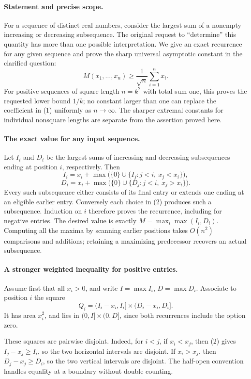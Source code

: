\paragraph{Statement and precise scope.}
For a sequence of distinct real numbers, consider the largest sum of a nonempty increasing or decreasing subsequence. The original request to ``determine'' this quantity has more than one possible interpretation. We give an exact recurrence for any given sequence and prove the sharp universal asymptotic constant in the clarified question:
\[
 M(x_1,\ldots,x_n)\geq\frac1{\sqrt n}\sum_{i=1}^n x_i.
 \tag{1}
\]
For positive sequences of square length \(n=k^2\) with total sum one, this proves the requested lower bound \(1/k\); no constant larger than one can replace the coefficient in (1) uniformly as \(n\to\infty\). The sharper extremal constants for individual nonsquare lengths are separate from the assertion proved here.

\paragraph{The exact value for any input sequence.}
Let \(I_i\) and \(D_i\) be the largest sums of increasing and decreasing subsequences ending at position \(i\), respectively. Then
\[
 I_i=x_i+\max\bigl(\{0\}\cup\{I_j:j<i,\ x_j<x_i\}\bigr),
\]
\[
 D_i=x_i+\max\bigl(\{0\}\cup\{D_j:j<i,\ x_j>x_i\}\bigr). \tag{2}
\]
Every such subsequence either consists of its final entry or extends one ending at an eligible earlier entry. Conversely each choice in (2) produces such a subsequence. Induction on \(i\) therefore proves the recurrence, including for negative entries. The desired value is exactly
\(M=\max_i\max(I_i,D_i)\). Computing all the maxima by scanning earlier positions takes \(O(n^2)\) comparisons and additions; retaining a maximizing predecessor recovers an actual subsequence.

\paragraph{A stronger weighted inequality for positive entries.}
Assume first that all \(x_i>0\), and write
\(I=\max I_i\), \(D=\max D_i\). Associate to position \(i\) the square
\[
 Q_i=(I_i-x_i,I_i]\times(D_i-x_i,D_i].
\]
It has area \(x_i^2\), and lies in \((0,I]\times(0,D]\), since both recurrences include the option zero.

These squares are pairwise disjoint. Indeed, for \(i<j\), if \(x_i<x_j\), then (2) gives \(I_j-x_j\geq I_i\), so the two horizontal intervals are disjoint. If \(x_i>x_j\), then \(D_j-x_j\geq D_i\), so the two vertical intervals are disjoint. The half-open convention handles equality at a boundary without double counting.

